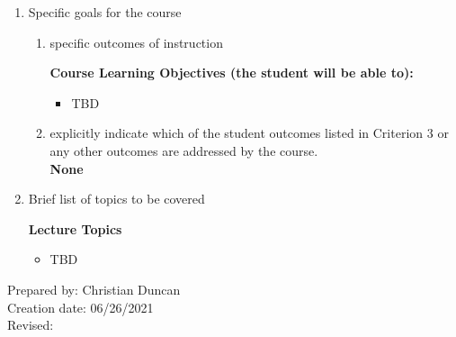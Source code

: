 \begin{enumerate}[1.]
\begin{enumerate}[a.]
\end{enumerate}

\item Specific goals for the course
\begin{enumerate}
\item specific outcomes of instruction\\ %
  {\bfseries
    Course Learning Objectives (the student will be able to):
    \begin{itemize}
      \item TBD
    \end{itemize}
  }

\item explicitly indicate which of the student outcomes listed in Criterion 3 or any other outcomes are addressed by the course.\\
  {\bfseries
    None
  }
\end{enumerate}

\item Brief list of topics to be covered\\
  {\bfseries
    Lecture Topics
    \begin{itemize}
      \item TBD
    \end{itemize}
  }

\end{enumerate}

\noindent Prepared by: Christian Duncan\\
\noindent Creation date: 06/26/2021\\
\noindent Revised:\\
